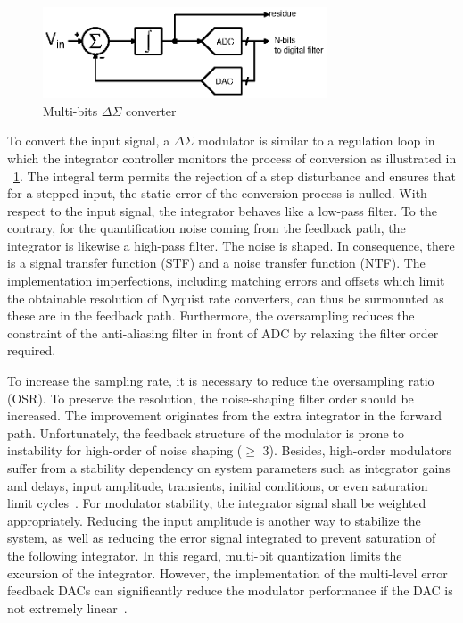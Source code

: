\begin{figure}[htp]
	\centering
	\includegraphics[width=0.75\textwidth]{Chapter2/Figs/Vector/sigma-delta.ps}
	\caption{Multi-bits $\Delta\Sigma$ converter}
	\label{fig:multi-bit}
\end{figure}

To convert the input signal, a $\Delta\Sigma$ modulator is similar to a regulation loop in which the integrator controller monitors the process of conversion as illustrated in \figurename~\ref{fig:multi-bit}. The integral term permits the rejection of a step disturbance and ensures that for a stepped input, the static error of the conversion process is nulled. With respect to the input signal, the integrator behaves like a low-pass filter. To the contrary, for the quantification noise coming from the feedback path, the integrator is likewise a high-pass filter. The noise is shaped. In consequence, there is a signal transfer function (STF) and a noise transfer function (NTF). The implementation imperfections, including matching errors and offsets which limit the obtainable resolution of Nyquist rate converters, can thus be surmounted as these are in the feedback path. Furthermore, the oversampling reduces the constraint of the anti-aliasing filter in front of ADC by relaxing the filter order required.

To increase the sampling rate, it is necessary to reduce the oversampling ratio (OSR). To preserve the resolution, the noise-shaping filter order should be increased. The improvement originates from the extra integrator in the forward path. Unfortunately, the feedback structure of the modulator is prone to instability for high-order of noise shaping ($\geq$ 3). Besides, high-order modulators suffer from a stability dependency on system parameters such as integrator gains and delays, input amplitude, transients, initial conditions, or even saturation limit cycles~\cite{Hein1993,Baird1994,Steven1996}. For modulator stability, the integrator signal shall be weighted appropriately. Reducing the input amplitude is another way to stabilize the system, as well as reducing the error signal integrated to prevent saturation of the following integrator. In this regard, multi-bit quantization limits the excursion of the integrator. However, the implementation of the multi-level error feedback DACs can significantly reduce the modulator performance if the DAC is not extremely linear~\cite{Medeiro1999}.


